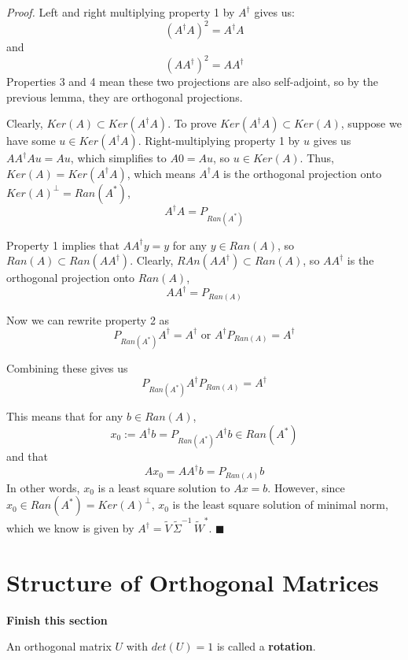 \documentclass[a4paper,10pt]{book}
\theoremstyle{plain}
\renewenvironment{proof}{\textsl{Proof.}}{\hfill$\blacksquare$}
\theoremstyle{plain}
\theoremstyle{definition}
\begin{document}
\begin{proof}
Left and right multiplying property 1 by $A^{\dagger}$ gives us: 
$$(A^{\dagger} A)^{2} = A^{\dagger} A$$ 
and
$$ (AA^{\dagger})^{2} = AA^{\dagger}$$
Properties 3 and 4 mean these two projections are also self-adjoint, so by the previous lemma, they are orthogonal projections. 

Clearly, $Ker(A) \subset Ker(A^{\dagger}A)$. To prove $Ker(A^{\dagger} A) \subset Ker(A)$, suppose we have some $u \in Ker(A^{\dagger} A)$. Right-multiplying property 1 by $u$ gives us $AA^{\dagger}Au = Au$, which simplifies to $A0 = Au$, so $u \in Ker(A)$. Thus, $Ker(A) = Ker(A^{\dagger}A)$, which means $A^{\dagger}A$ is the orthogonal projection onto $Ker(A)^{\perp} = Ran(A^{*})$, 
$$A^{\dagger}A = P_{Ran(A^{*})}$$

Property 1 implies that $AA^{\dagger} y = y$ for any $y \in Ran(A)$, so $Ran(A) \subset Ran(AA^{\dagger})$. Clearly, $RAn(AA^{\dagger}) \subset Ran(A)$, so $AA^{\dagger}$ is the orthogonal projection onto $Ran(A)$, 
$$AA^{\dagger} = P_{Ran(A)}$$

Now we can rewrite property 2 as 
$$P_{Ran(A^{*})} A^{\dagger} = A^{\dagger} \text{ or } A^{\dagger} P_{Ran(A)} = A^{\dagger}$$

Combining these gives us 
$$P_{Ran(A^{*})} A^{\dagger} P_{Ran(A)} = A^{\dagger}$$

This means that for any $b \in Ran(A)$, 
$$x_{0} := A^{\dagger} b = P_{Ran(A^{*})} A^{\dagger} b \in Ran(A^{*})$$
and that 
$$Ax_{0} = AA^{\dagger} b = P_{Ran(A)} b$$
In other words, $x_{0}$ is a least square solution to $Ax = b$. However, since $x_{0} \in Ran(A^{*}) = Ker(A)^{\perp}$, $x_{0}$ is the least square solution of minimal norm, which we know is given by $A^{\dagger} = \widetilde{V} \, \widetilde{\Sigma}^{-1} \, \widetilde{W}^{*}$.
\end{proof}

\section{Structure of Orthogonal Matrices}
\textbf{Finish this section}

An orthogonal matrix $U$ with $det(U) = 1$ is called a \textbf{rotation}. 
\end{document}
